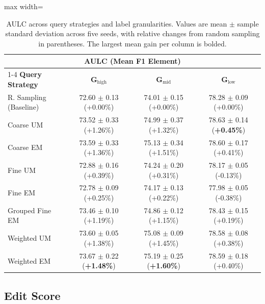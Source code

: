 \begin{table}[htbp]
    \centering
    \caption{AULC across query strategies and label granularities. Values are mean $\pm$ sample standard deviation across five seeds, with relative changes from random sampling in parentheses. The largest mean gain per column is bolded.}
    \label{tab:aulc_f1_element}
    \small
    \begin{adjustbox}{max width=\textwidth}
        \begin{tabular}{lccc}
            \toprule
            \multicolumn{4}{c}{\textbf{AULC (Mean F1 Element)}} \\
            \cmidrule(lr){1-4}
            \textbf{Query Strategy} & $\boldsymbol{G_{\mathrm{high}}}$ & $\boldsymbol{G_{\mathrm{mid}}}$ & $\boldsymbol{G_{\mathrm{low}}}$ \\
            \midrule
            R. Sampling (Baseline) & 72.60 $\pm$ 0.13 (+0.00\%) & 74.01 $\pm$ 0.15 (+0.00\%) & 78.28 $\pm$ 0.09 (+0.00\%) \\
            Coarse UM               & 73.52 $\pm$ 0.33 (+1.26\%) & 74.99 $\pm$ 0.37 (+1.32\%) & 78.63 $\pm$ 0.14 (\textbf{+0.45\%}) \\
            Coarse EM               & 73.59 $\pm$ 0.33 (+1.36\%) & 75.13 $\pm$ 0.34 (+1.51\%) & 78.60 $\pm$ 0.17 (+0.41\%) \\
            Fine UM                 & 72.88 $\pm$ 0.16 (+0.39\%) & 74.24 $\pm$ 0.20 (+0.31\%) & 78.17 $\pm$ 0.05 (-0.13\%) \\
            Fine EM                 & 72.78 $\pm$ 0.09 (+0.25\%) & 74.17 $\pm$ 0.13 (+0.22\%) & 77.98 $\pm$ 0.05 (-0.38\%) \\
            Grouped Fine EM         & 73.46 $\pm$ 0.10 (+1.19\%) & 74.86 $\pm$ 0.12 (+1.15\%) & 78.43 $\pm$ 0.15 (+0.19\%) \\
            Weighted UM             & 73.60 $\pm$ 0.05 (+1.38\%) & 75.08 $\pm$ 0.09 (+1.45\%) & 78.58 $\pm$ 0.08 (+0.38\%) \\
            Weighted EM             & 73.67 $\pm$ 0.22 (\textbf{+1.48\%}) & 75.19 $\pm$ 0.25 (\textbf{+1.60\%}) & 78.59 $\pm$ 0.18 (+0.40\%) \\
            \bottomrule
        \end{tabular}
    \end{adjustbox}
\end{table}

\subsection{Edit Score}

